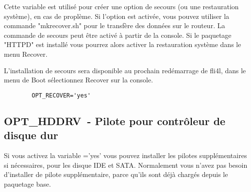     Cette variable est utilisé pour créer une option de secours (ou une
    restauration système), en cas de proplème. Si l'option est activée,
    vous pouvez utiliser la commande "mkrecover.sh" pour le transfère des
    données sur le routeur. La commande de secours peut être activé à
    partir de la console. Si le paquetage "HTTPD" est installé vous pourrez
    alors activer la restauration système dans le menu Recover.

    L'installation de secours sera disponible au prochain redémarrage de
    fli4l, dans le menu de Boot sélectionnez Recover sur la console.

\begin{example}
\begin{verbatim}
        OPT_RECOVER='yes'
\end{verbatim}
\end{example}


\subsection {OPT\_HDDRV~- Pilote pour contrôleur de disque dur}

    Si vous activez la variable ='yes' vous pouvez installer
    les pilotes supplémentaires si nécessaires, pour les disque IDE et SATA.
    Normalement vous n'avez pas besoin d'installer de pilote supplémentaire,
    parce qu'ils sont déjà chargés depuis le paquetage base.

